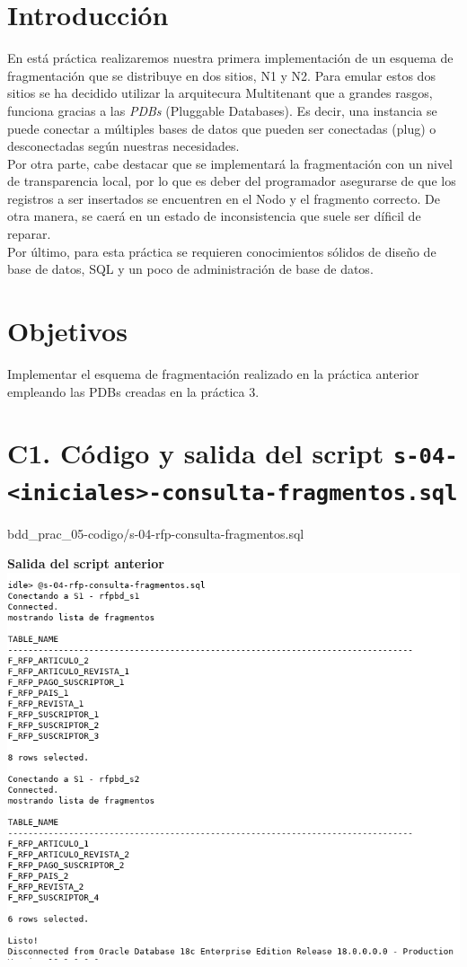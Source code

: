 \documentclass{article}
\begin{document}
\newpage

\section*{Introducción}
En está práctica realizaremos nuestra primera implementación de un esquema
de fragmentación que se distribuye en dos sitios, N1 y N2. Para emular estos
dos sitios se ha decidido utilizar la arquitecura Multitenant que a grandes
rasgos, funciona gracias a las \textit{PDBs} (Pluggable Databases). Es decir,
una instancia se puede conectar a múltiples bases de datos que pueden ser
conectadas (plug) o desconectadas según nuestras necesidades.\\ 

Por otra parte, cabe destacar que se implementará la fragmentación con un
nivel de transparencia local, por lo que es deber del programador asegurarse
de que los registros a ser insertados se encuentren en el Nodo y el fragmento
correcto. De otra manera, se caerá en un estado de inconsistencia que suele
ser díficil de reparar.\\

Por último, para esta práctica se requieren conocimientos sólidos de diseño 
de base de datos, SQL y un poco de administración de base de datos.

\section*{Objetivos}
Implementar el esquema de fragmentación realizado en la práctica anterior 
empleando las PDBs creadas en la práctica 3.

\section*{C1. Código y salida del script 
    \texttt{s-04-<iniciales>-consulta-fragmentos.sql}}


{bdd_prac_05-codigo/s-04-rfp-consulta-fragmentos.sql}

\newpage
\textbf{Salida del script anterior}\\
\includegraphics[width=0.8\linewidth]{bdd_prac05-c1-fragmentos}
\end{document}
